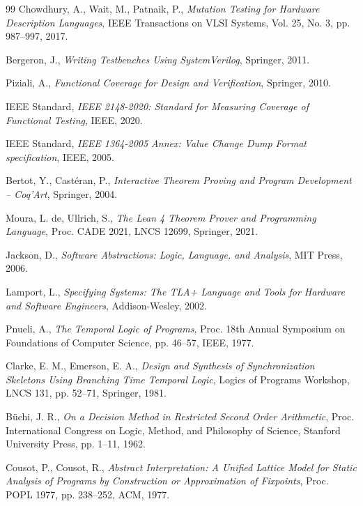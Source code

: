 ﻿\documentclass[12pt,a4paper]{report}
\begin{document}
\begin{thebibliography}{99}
  Chowdhury, A., Wait, M., Patnaik, P.,
  \textit{Mutation Testing for Hardware Description Languages},
  IEEE Transactions on VLSI Systems, Vol. 25, No. 3, pp. 987--997, 2017.

  Bergeron, J.,
  \textit{Writing Testbenches Using SystemVerilog},
  Springer, 2011.

  Piziali, A.,
  \textit{Functional Coverage for Design and Verification},
  Springer, 2010.

  IEEE Standard,
  \textit{IEEE 2148-2020: Standard for Measuring Coverage of Functional Testing},
  IEEE, 2020.

  IEEE Standard,
  \textit{IEEE 1364-2005 Annex: Value Change Dump Format specification},
  IEEE, 2005.

  Bertot, Y., Castéran, P.,
  \textit{Interactive Theorem Proving and Program Development -- Coq'Art},
  Springer, 2004.

  Moura, L. de, Ullrich, S.,
  \textit{The Lean 4 Theorem Prover and Programming Language},
  Proc. CADE 2021, LNCS 12699, Springer, 2021.

  Jackson, D.,
  \textit{Software Abstractions: Logic, Language, and Analysis},
  MIT Press, 2006.

  Lamport, L.,
  \textit{Specifying Systems: The TLA+ Language and Tools for Hardware and Software Engineers},
  Addison-Wesley, 2002.

  Pnueli, A.,
  \textit{The Temporal Logic of Programs},
  Proc. 18th Annual Symposium on Foundations of Computer Science,
  pp. 46--57, IEEE, 1977.

  Clarke, E. M., Emerson, E. A.,
  \textit{Design and Synthesis of Synchronization Skeletons Using Branching Time Temporal Logic},
  Logics of Programs Workshop, LNCS 131, pp. 52--71, Springer, 1981.

  Büchi, J. R.,
  \textit{On a Decision Method in Restricted Second Order Arithmetic},
  Proc. International Congress on Logic, Method, and Philosophy of Science,
  Stanford University Press, pp. 1--11, 1962.

  Cousot, P., Cousot, R.,
  \textit{Abstract Interpretation: A Unified Lattice Model for Static Analysis of Programs
  by Construction or Approximation of Fixpoints},
  Proc. POPL 1977, pp. 238--252, ACM, 1977.


\end{thebibliography}
\end{document}
